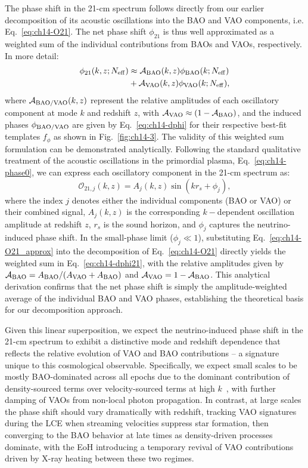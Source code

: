 \noindent The phase shift in the 21-cm spectrum follows directly from our earlier decomposition of its acoustic oscillations into the BAO and VAO components, i.e. Eq.~\eqref{eq:ch14-O21}. The net phase shift $\phi_{21}$ is thus well approximated as a weighted sum of the individual contributions from BAOs and VAOs, respectively. In more detail:
\begin{align}
    \phi_{21}(k,z;N_{\rm eff})&\approx\mathcal{A}_{\rm BAO}(k,z) \phi_{\rm BAO}(k;N_{\rm eff}) \nonumber \\
    &+ \mathcal{A}_{\rm VAO}(k,z) \phi_{\rm VAO}(k;N_{\rm eff}),\label{eq:ch14-dphi21}
\end{align}
where $\mathcal{A}_{\rm BAO/VAO}(k,z)$ represent the relative amplitudes of each oscillatory component at mode $k$ and redshift $z$, with $\mathcal{A}_{\rm VAO}\approx\left(1- \mathcal{A}_{\rm BAO}\right)$, and the induced phases $\phi_{\rm BAO/VAO}$ are given by Eq.~\eqref{eq:ch14-dphi} for their respective best-fit templates $f_\phi$ as shown in Fig.~\ref{fig:ch14-3}. The validity of this weighted sum formulation can be demonstrated analytically. Following the standard qualitative treatment of the  acoustic oscillations in the primordial plasma, Eq.~\eqref{eq:ch14-phase0}, we can express each oscillatory component in the 21-cm spectrum as:
\begin{equation}
\mathcal{O}_{21,j}(k,z) = A_j(k,z)\sin(kr_s + \phi_j), \label{eq:ch14-O21_approx}
\end{equation}
where the index $j$ denotes either the individual components (BAO or VAO) or their combined signal, $A_j(k,z)$ is the corresponding $k-$dependent oscillation amplitude at redshift $z$, $r_s$ is the sound horizon, and $\phi_j$ captures the neutrino-induced phase shift. In the small-phase limit ($\phi_j \ll 1$), substituting Eq.~\eqref{eq:ch14-O21_approx} into the decomposition of Eq.~\eqref{eq:ch14-O21} directly yields the weighted sum in Eq.~\eqref{eq:ch14-dphi21}, with the relative amplitudes given by $\mathcal{A}_{\rm BAO}=A_{\rm BAO}/(A_{\rm VAO}+A_{\rm BAO})$ and $\mathcal{A}_{\rm VAO}=1 -\mathcal{A}_{\rm BAO}$. This analytical derivation confirms that the net phase shift is simply the amplitude-weighted average of the individual BAO and VAO phases, establishing the theoretical basis for our decomposition approach.

Given this linear superposition, we expect the neutrino-induced phase shift in the 21-cm spectrum to exhibit a distinctive mode and redshift dependence that reflects the relative evolution of VAO and BAO contributions -- a signature unique to this cosmological observable. Specifically, we expect small scales to be mostly BAO-dominated across all epochs due to the dominant contribution of density-sourced terms over velocity-sourced terms at high $k$~\citep{cruz25}, with further damping of VAOs from non-local photon propagation. In contrast, at large scales the phase shift should vary dramatically with redshift, tracking VAO signatures during the LCE when streaming velocities suppress star formation, then converging to the BAO behavior at late times as density-driven processes dominate, with the EoH introducing a temporary revival of VAO contributions driven by X-ray heating between these two regimes.

